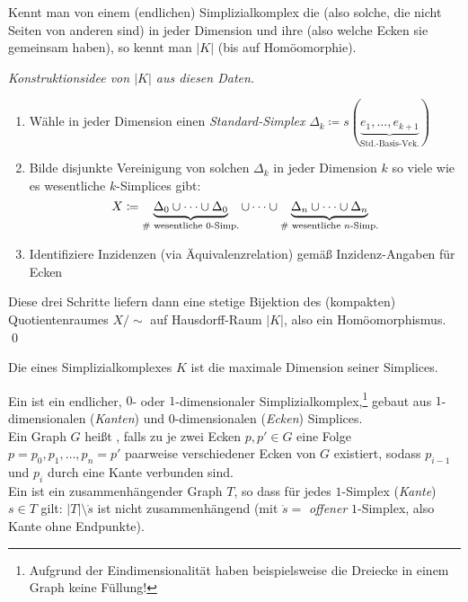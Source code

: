 \begin{remark}
  Kennt man von einem (endlichen) Simplizialkomplex die \label{def:wesentlicheSimplices} (also solche, die nicht Seiten von anderen sind) in jeder Dimension und ihre \label{def:inzidenzen} (also welche Ecken sie gemeinsam haben), so kennt man \( \vert K \vert \) (bis auf Homöomorphie).
  \begin{proof}[Konstruktionsidee von \( \vert K \vert \) aus diesen Daten]
    \
    \begin{enumerate}
      \item Wähle in jeder Dimension einen \emph{Standard-Simplex} \( \Delta_k \coloneqq s(\underbrace{e_1, \dots, e_{k+1}}_{\text{Std.-Basis-Vek.}}) \)
      \item Bilde disjunkte Vereinigung von solchen \( \Delta_k \) in jeder Dimension \( k \) so viele wie es wesentliche \( k \)-Simplices gibt:
        \begin{equation*}
          X \coloneqq \underbrace{\Delta_0 \cup \dots \cup \Delta_0}_{\text{\# wesentliche \( 0 \)-Simp.}} \cup \dots \cup \underbrace{\Delta_n \cup \dots \cup \Delta_n}_{\text{\# wesentliche \( n \)-Simp.}}
        \end{equation*}
      \item Identifiziere Inzidenzen (via Äquivalenzrelation) gemäß Inzidenz-Angaben für Ecken
    \end{enumerate}
    Diese drei Schritte liefern dann eine stetige Bijektion des (kompakten) Quotientenraumes \( X/\sim \) auf Hausdorff-Raum \( \vert K \vert \), also ein Homöomorphismus. \qed{}
  \end{proof}
\end{remark}

\begin{definition}[Dimension]
  Die  eines Simplizialkomplexes \( K \) ist die maximale Dimension seiner Simplices.
\end{definition}

\begin{remark}
  Ein \label{def:graph} ist ein endlicher, \( 0 \)- oder \( 1 \)-dimensionaler Simplizialkomplex,\footnote{Aufgrund der Eindimensionalität haben beispielsweise die Dreiecke in einem Graph keine Füllung!} gebaut aus \( 1 \)-dimensionalen (\emph{Kanten}) und \( 0 \)-dimensionalen (\emph{Ecken}) Simplices. \\
  Ein Graph \( G \) heißt \term{zusammenhängend}\label{def:zusammenhaengend}, falls zu je zwei Ecken \( p, p' \in G \) eine Folge \( p = p_0, p_1, \dots, p_n = p' \) paarweise verschiedener Ecken von \( G \) existiert, sodass \( p_{i-1} \) und \( p_i \) durch eine Kante verbunden sind. \\
  Ein \term{Baum}\label{def:baum} ist ein zusammenhängender Graph \( T \), so dass für jedes \( 1 \)-Simplex (\emph{Kante}) \( s \in T \) gilt: \( \vert T \vert \setminus \mathring{s} \) ist nicht zusammenhängend (mit \( \mathring{s} = \) \emph{offener} \( 1 \)-Simplex, also Kante ohne Endpunkte).
\end{remark}

